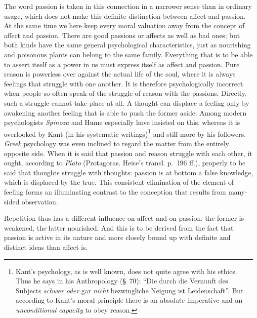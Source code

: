 \documentclass[12pt,a4paper]{book}
\newcommand{\opage}[1]{\marginnote{\footnotesize\textit{[#1]}}}
\begin{document}
The word passion is taken in this connection in a narrower sense than
in ordinary usage, which does not make this definite distinction
between affect and passion. At the same time we here keep every moral
valuation away from the concept of affect and passion. There are good
passions or affects as well as bad ones; but both kinds have the same
general psychological characteristics, just as nourishing and poisonous
plants can belong to the same family. Everything that is to be able to
assert itself as a power in us must express itself as affect and
passion. Pure reason is powerless over against the actual life of the
soul, where it is always feelings that struggle with one another. It is
therefore psychologically incorrect when people so often speak of the
struggle of reason with the passions. Directly, such a struggle cannot
take place at all. A thought can displace a feeling only by awakening
another feeling that is able to push the former aside. Among modern
psychologists \emph{Spinoza} and Hume especially have insisted on this,
whereas it is overlooked by Kant (in
his systematic writings)\footnote{Kant's psychology, as is well known,
does not quite agree with his ethics. Thus he says in his Anthropology
(\S~70): ``Die durch die Vernunft des Subjects \emph{schwer oder} gar
\emph{nicht} bezwingliche Neigung ist Leidenschaft''. But according to
Kant's moral principle there is an absolute imperative and an
\emph{unconditional capacity} to obey reason.} and still more by his
followers. \emph{Greek} psychology was even inclined to regard the
matter from the entirely opposite side. When it is said that passion and
reason struggle with each other, it ought, according
\opage{336}to \emph{Plato} (Protagoras. Heise's transl. p.~196 ff.),
properly to be said that thoughts struggle with thoughts: passion is at
bottom a false knowledge, which is displaced by the true. This
consistent elimination of the element of feeling forms an illuminating
contrast to the conception that results from many-sided observation.

Repetition thus has a different influence on affect and on passion; the
former is weakened, the latter nourished. And this is to be derived from
the fact that passion is active in its nature and more closely bound up
with definite and distinct ideas than affect is.
\end{document}
